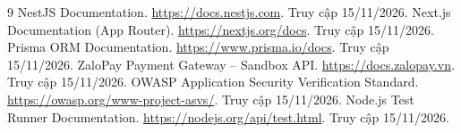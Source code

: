﻿\documentclass[12pt,a4paper]{article}
\begin{document}
\hypersetup{pageanchor=false}
\makecover
\hypersetup{pageanchor=true}



\clearpage
{\footnotesize{}\tableofcontents}
\clearpage















\clearpage
\begingroup
\renewcommand{\refname}{Tài liệu tham khảo}
{}
\begin{thebibliography}{9}
   NestJS Documentation. \url{https://docs.nestjs.com}. Truy cập 15/11/2026.
   Next.js Documentation (App Router). \url{https://nextjs.org/docs}. Truy cập 15/11/2026.
   Prisma ORM Documentation. \url{https://www.prisma.io/docs}. Truy cập 15/11/2026.
   ZaloPay Payment Gateway -- Sandbox API. \url{https://docs.zalopay.vn}. Truy cập 15/11/2026.
   OWASP Application Security Verification Standard. \url{https://owasp.org/www-project-asvs/}.
        Truy cập 15/11/2026.
   Node.js Test Runner Documentation. \url{https://nodejs.org/api/test.html}. Truy cập 15/11/2026.
\end{thebibliography}
\endgroup
\end{document}

